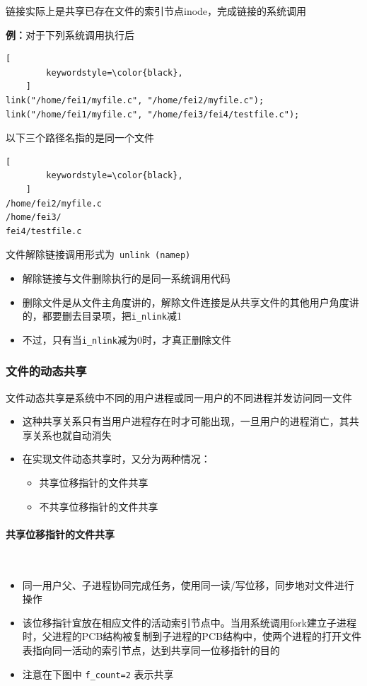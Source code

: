 \documentclass[cs4size,a4paper,10pt]{ctexart}
\begin{document}
	链接实际上是共享已存在文件的索引节点inode，完成链接的系统调用

	\textbf{例：}对于下列系统调用执行后
	\begin{lstlisting}[
		keywordstyle=\color{black},
	]
link("/home/fei1/myfile.c", "/home/fei2/myfile.c");
link("/home/fei1/myfile.c", "/home/fei3/fei4/testfile.c");
	\end{lstlisting}
	以下三个路径名指的是同一个文件
	\begin{lstlisting}[
		keywordstyle=\color{black},
	]
/home/fei2/myfile.c
/home/fei3/
fei4/testfile.c
	\end{lstlisting}


	文件解除链接调用形式为\ \verb|unlink (namep)|
	\begin{itemize}
		\item 解除链接与文件删除执行的是同一系统调用代码
		\item 删除文件是从文件主角度讲的，解除文件连接是从共享文件的其他用户角度讲的，都要删去目录项，把\verb|i_nlink|减1
		\item 不过，只有当\verb|i_nlink|减为0时，才真正删除文件
	\end{itemize}

	\subsubsection{文件的动态共享}
	文件动态共享是系统中不同的用户进程或同一用户的不同进程并发访问同一文件
	\begin{itemize}
		\item 这种共享关系只有当用户进程存在时才可能出现，一旦用户的进程消亡，其共享关系也就自动消失
		\item 在实现文件动态共享时，又分为两种情况：
		\begin{itemize}
			\item 共享位移指针的文件共享
			\item 不共享位移指针的文件共享
		\end{itemize}
	\end{itemize}

	\paragraph{共享位移指针的文件共享}~{}

	\begin{itemize}
		\item 同一用户父、子进程协同完成任务，使用同一读/写位移，同步地对文件进行操作
		\item 该位移指针宜放在相应文件的活动索引节点中。当用系统调用fork建立子进程时，父进程的PCB结构被复制到子进程的PCB结构中，使两个进程的打开文件表指向同一活动的索引节点，达到共享同一位移指针的目的
		\item 注意在下图中 \verb|f_count=2| 表示共享
	\end{itemize}
\end{document}
